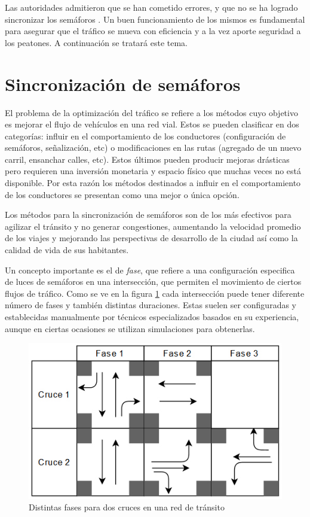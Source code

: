 Las autoridades admitieron que se han cometido errores, y que no se ha logrado sincronizar los semáforos \citep{olivera2013}. Un buen funcionamiento de los mismos es fundamental para asegurar que el tráfico se mueva con eficiencia y a la vez aporte seguridad a los peatones. A continuación se tratará este tema. 


\section{Sincronización de semáforos}
El problema de la optimización del tráfico se refiere a los métodos cuyo objetivo es mejorar el flujo de vehículos en una red vial. Estos se pueden clasificar en dos categorías: influir en el comportamiento de los conductores (configuración de semáforos, señalización, etc) o modificaciones en las rutas (agregado de un nuevo carril, ensanchar calles, etc). 
Estos últimos pueden producir mejoras drásticas pero requieren una inversión monetaria y espacio físico que muchas veces no está disponible. Por esta razón los métodos destinados a influir en el comportamiento de los conductores se presentan como una mejor o única opción.

Los métodos para la sincronización de semáforos son de los más efectivos para agilizar el tránsito y no generar congestiones, aumentando la velocidad promedio de los viajes y mejorando las perspectivas de desarrollo de la ciudad así como la calidad de vida de sus habitantes. 

Un concepto importante es el de \emph{fase}, que refiere a una configuración especifica de luces de semáforos en una intersección, que permiten el movimiento de ciertos flujos de tráfico. Como se ve en la figura \ref{fig:fases} cada intersección puede tener diferente número de fases y también distintas duraciones. Estas suelen ser configuradas y establecidas manualmente por técnicos especializados basados en su experiencia, aunque en ciertas ocasiones se utilizan simulaciones para obtenerlas. 

\begin{figure}[H]
	\centering
	\includegraphics[width=0.8\linewidth]{Figures/fases1}
	\caption{Distintas fases para dos cruces en una red de tránsito}
	\label{fig:fases}
\end{figure}

